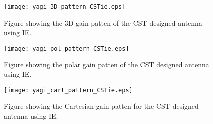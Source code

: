 \begin{figure}[!h]
  \centering
  \texttt{[image: yagi\_3D\_pattern\_CSTie.eps]}
  \caption{Figure showing the 3D gain patten of the CST designed antenna using IE.}
  \label{fig:yagi_3D_pattern_CSTie}
\end{figure}

\begin{figure}[!h]
  \centering
  \texttt{[image: yagi\_pol\_pattern\_CSTie.eps]}
  \caption{Figure showing the polar gain patten of the CST designed antenna using IE.}
  \label{fig:yagi_pol_pattern_CSTie}
\end{figure}

\begin{figure}[!h]
  \centering
  \texttt{[image: yagi\_cart\_pattern\_CSTie.eps]}
  \caption{Figure showing the Cartesian gain patten for the CST designed antenna using IE.}
  \label{fig:yagi_cart_pattern_CSTie}
\end{figure}
